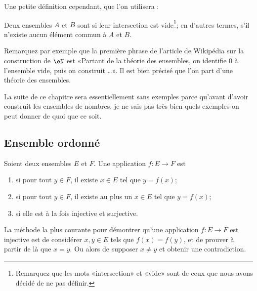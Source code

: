 Une petite définition cependant, que l'on utilisera :
\begin{definition}\label{DefEnsemblesDisjoints}
    Deux ensembles $A$ et $B$ sont  si leur intersection est vide\footnote{Remarquez que les mots «intersection» et «vide» sont de ceux que nous avons décidé de ne pas définir.}; en d'autres termes, s'il n'existe aucun élément commun à $A$ et $B$.
\end{definition}

\begin{normaltext}
    Remarquez par exemple que la première phrase de l'article de Wikipédia sur la construction de \( \eN\) est «Partant de la théorie des ensembles, on identifie 0 à l'ensemble vide, puis on construit \ldots». Il est bien précisé que l'on part d'une théorie des ensembles.
\end{normaltext}

\begin{normaltext}
    La suite de ce chapitre sera essentiellement sans exemples parce qu'avant d'avoir construit les ensembles de nombres, je ne sais pas très bien quels exemples on peut donner de quoi que ce soit.
\end{normaltext}

\subsection{Ensemble ordonné}

\begin{definition}
    Soient deux ensembles \( E\) et \( F\). Une application \( f\colon E\to F\) est
    \begin{enumerate}
        \item
             si pour tout \( y\in F\), il existe \( x\in E\) tel que \( y=f(x)\);
        \item
             si pour tout \( y\in F\), il existe au plus un \(x\in E \) tel que \( y=f(x)\);
        \item
             si elle est à la fois injective et surjective.
    \end{enumerate}
\end{definition}
La méthode la plus courante pour démontrer qu'une application \( f\colon E\to F\) est injective est de considérer \( x,y\in E\) tels que \( f(x)=f(y)\), et de prouver à partir de là que \( x=y\). Ou alors de supposer \( x\neq y\) et obtenir une contradiction.

